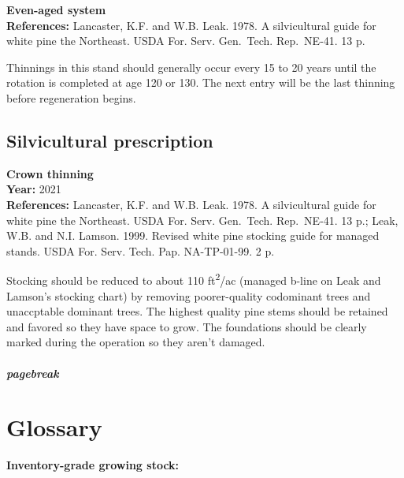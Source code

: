 \documentclass[]{tufte-handout}
\begin{document}
\textbf{Even-aged system}\\
\textbf{References:} Lancaster, K.F. and W.B. Leak. 1978. A
silvicultural guide for white pine the Northeast. USDA For. Serv.
Gen.~Tech. Rep.~NE-41. 13 p.

Thinnings in this stand should generally occur every 15 to 20 years
until the rotation is completed at age 120 or 130. The next entry will
be the last thinning before regeneration begins.

\subsection{Silvicultural
prescription}\label{silvicultural-prescription-3}

\textbf{Crown thinning}\\
\textbf{Year:} 2021\\
\textbf{References:} Lancaster, K.F. and W.B. Leak. 1978. A
silvicultural guide for white pine the Northeast. USDA For. Serv.
Gen.~Tech. Rep.~NE-41. 13 p.; Leak, W.B. and N.I. Lamson. 1999. Revised
white pine stocking guide for managed stands. USDA For. Serv. Tech. Pap.
NA-TP-01-99. 2 p.

Stocking should be reduced to about 110 ft\textsuperscript{2}/ac
(managed b-line on Leak and Lamson's stocking chart) by removing
poorer-quality codominant trees and unaccptable dominant trees. The
highest quality pine stems should be retained and favored so they have
space to grow. The foundations should be clearly marked during the
operation so they aren't damaged.

\subparagraph{pagebreak}\label{pagebreak-5}

\section{Glossary}\label{glossary}

\textbf{Inventory-grade growing stock:}
\end{document}
